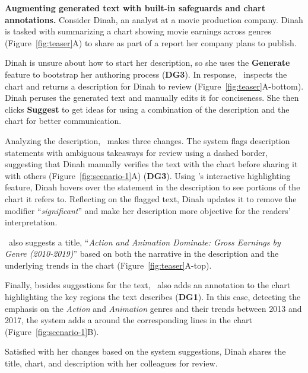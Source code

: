 \vspace{.5em}\noindent\textbf{Augmenting generated text with built-in safeguards and chart annotations.}
Consider Dinah, an analyst at a movie production company.
Dinah is tasked with summarizing a chart showing movie earnings across genres (Figure~\ref{fig:teaser}A) to share as part of a report her company plans to publish.

Dinah is unsure about how to start her description, so she uses the {\small{}} \textbf{Generate} feature to bootstrap her authoring process (\textbf{DG3}).
In response, \pluto~inspects the chart and returns a description for Dinah to review (Figure~\ref{fig:teaser}A-bottom).
Dinah peruses the generated text and manually edits it for conciseness.
She then clicks {\small{}} \textbf{Suggest} to get ideas for using a combination of the description and the chart for better communication.

Analyzing the description, \pluto~makes three changes.
The system flags
description statements with ambiguous takeaways
for review using a dashed border, suggesting that Dinah manually verifies the text with the chart before sharing it with others (Figure~\ref{fig:scenario-1}A) (\textbf{DG3}).
Using \pluto's interactive highlighting feature, Dinah hovers over the statement in the description to see portions of the chart it refers to.
Reflecting on the flagged text, Dinah updates it to remove the modifier ``\textit{significant}'' and make her description more objective for the readers' interpretation.

\pluto~also suggests a title, ``\textit{Action and Animation Dominate: Gross Earnings by Genre (2010-2019)}'' based on both the narrative in the description and the underlying trends in the chart (Figure~\ref{fig:teaser}A-top).

Finally, besides suggestions for the text, \pluto~also adds an annotation to the chart highlighting the key regions the text describes (\textbf{DG1}).
In this case, detecting the emphasis on the \textit{Action} and \textit{Animation} genres and their trends between 2013 and 2017, the system adds a  around the corresponding lines in the chart (Figure~\ref{fig:scenario-1}B).

Satisfied with her changes based on the system suggestions, Dinah shares the title, chart, and description with her colleagues for review.

